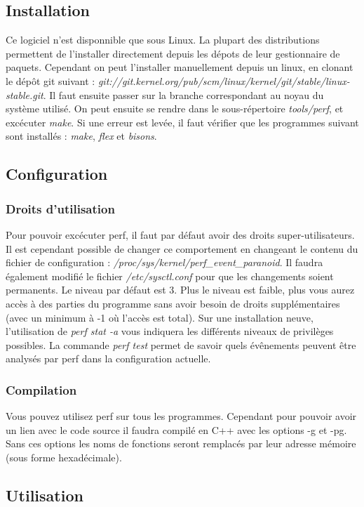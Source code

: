 \documentclass[a4paper]{article}
\begin{document}
\subsection{Installation}
    Ce logiciel n'est disponnible que sous Linux. La plupart des distributions permettent de l'installer directement depuis les dépots de leur gestionnaire de paquets. 
    Cependant on peut l'installer manuellement depuis un linux, en clonant le dépôt git suivant : \emph{git://git.kernel.org/pub/scm/linux/kernel/git/stable/linux-stable.git}. Il faut ensuite passer sur la branche correspondant au noyau du système utilisé.
    On peut ensuite se rendre dans le sous-répertoire \emph{tools/perf}, et excécuter \emph{make}. Si une erreur est levée, il faut vérifier que les programmes suivant sont installés : \emph{make}, \emph{flex} et \emph{bisons}.
\subsection{Configuration}
    \subsubsection{Droits d'utilisation}
        Pour pouvoir excécuter perf, il faut par défaut avoir des droits super-utilisateurs. 
        Il est cependant possible de changer ce comportement en changeant le contenu du fichier de configuration : \emph{/proc/sys/kernel/perf\_event\_paranoid}. Il faudra également modifié le fichier \emph{/etc/sysctl.conf} pour que les changements soient permanents.
        Le niveau par défaut est 3. Plus le niveau est faible, plus vous aurez accès à des parties du programme sans avoir besoin de droits supplémentaires (avec un minimum à -1 où l'accès est total).
        Sur une installation neuve, l'utilisation de \emph{perf stat -a} vous indiquera les différents niveaux de privilèges possibles.
        La commande \emph{perf test} permet de savoir quels évênements peuvent être analysés par perf dans la configuration actuelle.
    \subsubsection{Compilation}
        Vous pouvez utilisez perf sur tous les programmes. Cependant pour pouvoir avoir un lien avec le code source il faudra compilé en C++ avec les options -g et -pg.
        Sans ces options les noms de fonctions seront remplacés par leur adresse mémoire (sous forme hexadécimale).
\subsection{Utilisation}
\end{document}
